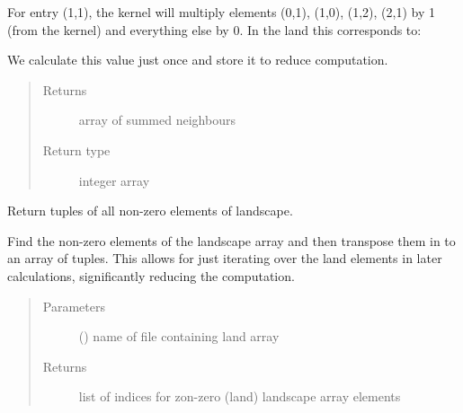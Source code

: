 \documentclass[letterpaper,10pt,english]{sphinxmanual}
\begin{document}
\begin{fulllineitems}
\begin{fulllineitems}
For entry (1,1), the kernel will multiply elements
(0,1), (1,0), (1,2), (2,1) by 1 (from the kernel)
and everything else by 0.
In the land this corresponds to:

\begin{sphinxVerbatim}[commandchars=\\\{\}]
             
\end{sphinxVerbatim}

We calculate this value just once and store it to reduce computation.
\begin{quote}\begin{description}
\item[{Returns}] \leavevmode
array of summed neighbours

\item[{Return type}] \leavevmode
integer array

\end{description}\end{quote}

\end{fulllineitems}


\begin{fulllineitems}
\label{\detokenize{pumha:pumha.env.Landscape.find_land_squares_indices}}
Return tuples of all non-zero elements of landscape.

Find the non-zero elements of the landscape array and then
transpose them in to an array of tuples.  This allows for just
iterating over the land elements in later calculations,
significantly reducing the computation.
\begin{quote}\begin{description}
\item[{Parameters}] \leavevmode
{} () \textendash{} name of file containing land array

\item[{Returns}] \leavevmode
list of indices for zon-zero (land) landscape array elements


\end{description}
\end{quote}
\end{fulllineitems}
\end{fulllineitems}
\end{document}
